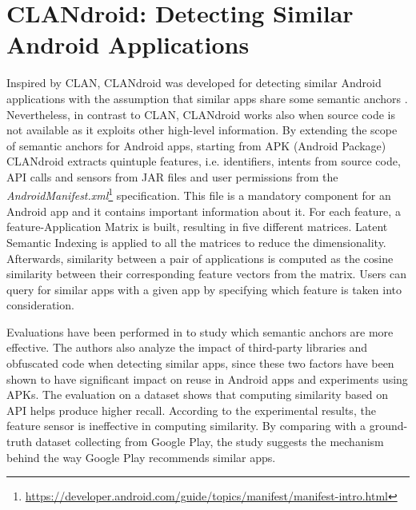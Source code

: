 %


\section{CLANdroid: Detecting Similar Android Applications}\label{sec:clandroid}

Inspired by CLAN, CLANdroid was developed for detecting similar Android applications with the assumption that similar apps share some semantic anchors \cite{10.1109ICPC.2016.7503721}. Nevertheless, in contrast to CLAN, CLANdroid works also when source code is not available as it exploits other high-level information. By extending the scope of semantic anchors for Android apps, starting from APK (Android Package) CLANdroid extracts quintuple features, i.e. identifiers, intents from source code, API calls and sensors from JAR files and user permissions from the \textit{AndroidManifest.xml}\footnote{\url{https://developer.android.com/guide/topics/manifest/manifest-intro.html}} specification. This file is a mandatory component for an Android app and it contains important information about it. For each feature, a feature-Application Matrix is built, resulting in five different matrices. Latent Semantic Indexing is applied to all the matrices to reduce the dimensionality. Afterwards, similarity between a pair of applications is computed as the cosine similarity between their corresponding feature vectors from the matrix. Users can query for similar apps with a given app by specifying which feature is taken into consideration. 

Evaluations have been performed in \cite{10.1109ICPC.2016.7503721} to study which semantic anchors are more effective. The authors also analyze the impact of third-party libraries and obfuscated code when detecting similar apps, since these two factors have been shown to have significant impact on reuse in Android apps and experiments using APKs. The evaluation on a dataset shows that computing similarity based on API helps produce higher recall. According to the experimental results, the feature sensor is ineffective in computing similarity. By comparing with a ground-truth dataset collecting from Google Play, the study suggests the mechanism behind the way Google Play recommends similar apps. %


